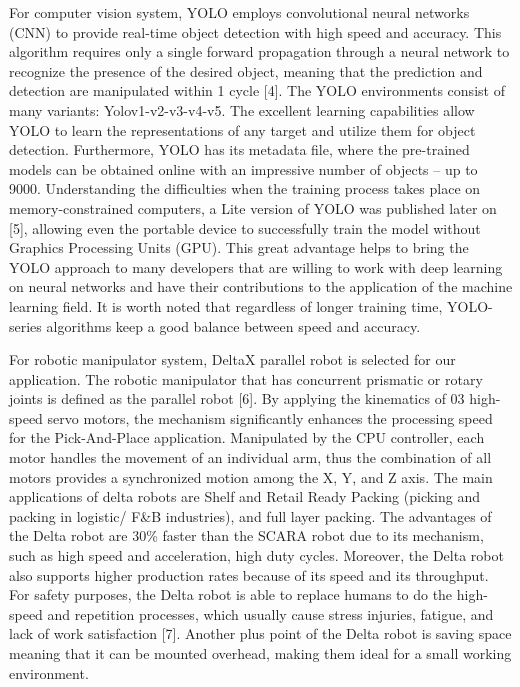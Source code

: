 \documentclass[10pt, letterpaper]{article}
\begin{document}
    For computer vision system, YOLO employs convolutional neural networks (CNN) to provide real-time object detection with high speed and accuracy. This algorithm requires only a single forward propagation through a neural network to recognize the presence of the desired object, meaning that the prediction and detection are manipulated within 1 cycle [4]. The YOLO environments consist of many variants: Yolov1-v2-v3-v4-v5. The excellent learning capabilities allow YOLO to learn the representations of any target and utilize them for object detection. Furthermore, YOLO has its metadata file, where the pre-trained models can be obtained online with an impressive number of objects – up to 9000. Understanding the difficulties when the training process takes place on memory-constrained computers, a Lite version of YOLO was published later on [5], allowing even the portable device to successfully train the model without Graphics Processing Units (GPU). This great advantage helps to bring the YOLO approach to many developers that are willing to work with deep learning on neural networks and have their contributions to the application of the machine learning field. It is worth noted that regardless of longer training time, YOLO-series algorithms keep a good balance between speed and accuracy.\par
    For robotic manipulator system, DeltaX parallel robot is selected for our application. The robotic manipulator that has concurrent prismatic or rotary joints is defined as the parallel robot [6]. By applying the kinematics of 03 high-speed servo motors, the mechanism significantly enhances the processing speed for the Pick-And-Place application. Manipulated by the CPU controller, each motor handles the movement of an individual arm, thus the combination of all motors provides a synchronized motion among the X, Y, and Z axis. The main applications of delta robots are Shelf and Retail Ready Packing (picking and packing in logistic/ F\&B industries), and full layer packing. The advantages of the Delta robot are 30\% faster than the SCARA robot due to its mechanism, such as high speed and acceleration, high duty cycles. Moreover, the Delta robot also supports higher production rates because of its speed and its throughput. For safety purposes, the Delta robot is able to replace humans to do the high-speed and repetition processes, which usually cause stress injuries, fatigue, and lack of work satisfaction [7]. Another plus point of the Delta robot is saving space meaning that it can be mounted overhead, making them ideal for a small working environment.\par
\end{document}
